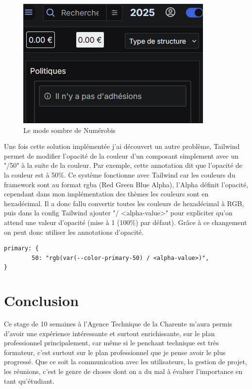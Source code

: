 \documentclass[a4paper,12pt]{report}
\begin{document}
\begin{figure}[H]
    \centering
    \includegraphics[scale=0.5]{exempleDarkmode.png}
    \caption{Le mode sombre de Numérobis}
    \label{fig:dark-mode}
\end{figure}

Une fois cette solution implémentée j'ai découvert un autre problème, Tailwind permet de modifier l'opacité de la couleur d'un composant simplement avec un "/50" à la suite de la couleur. Par exemple, cette annotation dit que l'opacité de la couleur est à 50\%. Ce système fonctionne avec Tailwind car les couleurs du framework sont au format rgba (Red Green Blue Alpha), l'Alpha définit l'opacité, cependant dans mon implémentation des thèmes les couleurs sont en hexadécimal. Il a donc fallu convertir toutes les couleurs de hexadécimal à RGB, puis dans la config Tailwind ajouter "/ <alpha-value>" pour expliciter qu'on attend une valeur d'opacité (mise à 1 (100\%) par défaut). Grâce à ce changement on peut donc utiliser les annotations d'opacité.

\begin{verbatim}
primary: {
        50: "rgb(var(--color-primary-50) / <alpha-value>)",
}
\end{verbatim}

\chapter{Conclusion}

Ce stage de 10 semaines à l'Agence Technique de la Charente m'aura permis d'avoir une expérience intéressante et surtout enrichissante, sur le plan professionnel principalement, car même si le penchant technique est très formateur, c'est surtout sur le plan professionnel que je pense avoir le plus progressé. Que ce soit la communication avec les utilisateurs, la gestion de projet, les réunions, c'est le genre de choses dont on a du mal à évaluer l'importance en tant qu'étudiant.
\end{document}
